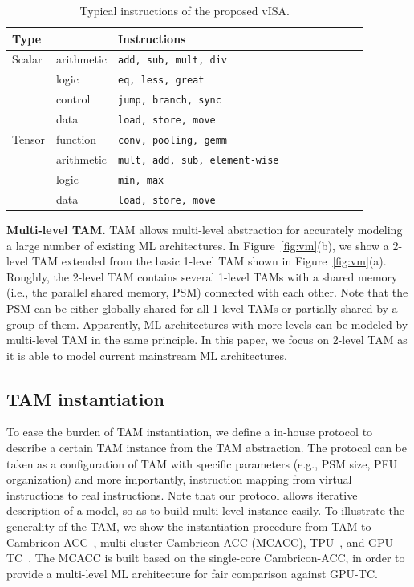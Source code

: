 \begin{table}[b]
  \centering
  \scriptsize
  \vspace{-25pt}
  \caption{\footnotesize Typical instructions of the proposed vISA.}
  \label{tab:virtualISA}
  \begin{tabular}{llllllllll}
    \toprule
    Type &&Instructions\\
    \midrule
    Scalar &arithmetic& \texttt{add, sub, mult, div} \\
    &logic&\texttt{eq, less, great}\\
    &control&\texttt{jump, branch, sync}\\
    &data&\texttt{load, store, move}\\
    \midrule
    Tensor&function&\texttt{conv, pooling, gemm}\\
    &arithmetic&\texttt{mult, add, sub, element-wise}\\
    &logic&\texttt{min, max}\\
    &data&\texttt{load, store, move}\\
    \bottomrule
  \end{tabular}
  \end{table}



\textbf{Multi-level TAM.} TAM allows multi-level abstraction for accurately modeling a large number of existing
ML architectures. In Figure~\ref{fig:vm}(b), we show a 2-level TAM extended from
the basic 1-level TAM shown in Figure~\ref{fig:vm}(a). Roughly, the 2-level TAM
contains several 1-level TAMs with a shared memory (i.e., the parallel shared
memory, PSM) connected with each other. 
Note that the PSM can be either globally shared for all 1-level TAMs or partially shared by a group of them. 
Apparently, ML architectures with more levels can be modeled by multi-level TAM
in the same principle. In this paper, we focus on 2-level TAM as it is
able to model current mainstream ML architectures. 


\subsection{TAM instantiation}
To ease the burden of TAM instantiation, we define a in-house protocol
to describe a certain TAM instance from the TAM abstraction. The protocol can be
taken as a configuration of TAM with specific parameters (e.g., PSM size, PFU
organization) and more importantly, instruction mapping from virtual
instructions to real instructions. Note that our protocol allows
iterative description of a model, so as to build multi-level instance easily. To
illustrate the generality of the TAM, we
show the instantiation procedure from TAM to Cambricon-ACC~\cite{liu2016cambricon}, multi-cluster Cambricon-ACC (MCACC), 
TPU~\cite{jouppi2017datacenter}, and GPU-TC~\cite{markidis2018nvidia}. The MCACC is built based on the single-core Cambricon-ACC, in order
to provide a multi-level ML architecture for fair comparison against GPU-TC.

